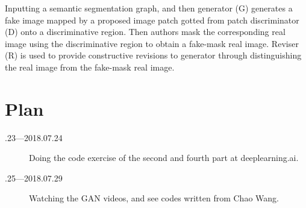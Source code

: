 \documentclass[a4paper]{article}
\begin{document}
Inputting a semantic segmentation graph, and then generator (G) generates a fake image mapped by a proposed image patch gotted from patch discriminator (D) onto a discriminative region. Then authors mask the corresponding real image using the discriminative region to obtain a fake-mask real image. Reviser (R) is used to provide constructive revisions to generator through distinguishing the real image from the fake-mask real image. 

\section{Plan}

\begin{description}
\item[.23---2018.07.24] Doing the code exercise of the second and fourth part at deeplearning.ai.
\item[.25---2018.07.29] Watching the GAN videos, and see codes written from Chao Wang.
\end{description}









{\small


}
\end{document}
